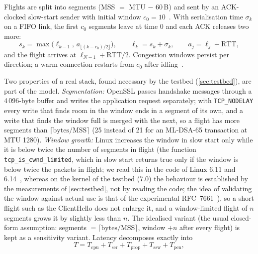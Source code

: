\documentclass[preprint,12pt]{elsarticle}
\begin{document}
Flights are split into segments (MSS $=$ MTU $-$ 60\,B) and sent by an ACK-clocked slow-start sender with initial window $c_0=10$~\cite{rfc6928,rfc5681}. With serialisation time $\sigma_k$ on a FIFO link, the first $c_0$ segments leave at time 0 and each ACK releases two more:
\begin{equation}
s_k=\max\!\big(\ell_{k-1},\,a_{\lfloor (k-c_0)/2\rfloor}\big),\qquad \ell_k=s_k+\sigma_k,\qquad a_j=\ell_j+\mathrm{RTT},
\label{eq:flight}
\end{equation}
and the flight arrives at $\ell_{N-1}+\mathrm{RTT}/2$. Congestion windows persist per direction; a warm connection restarts from $c_0$ after idling~\cite{rfc5681}.

Two properties of a real stack, found necessary by the testbed (\cref{sec:testbed}), are part of the model. \emph{Segmentation:} OpenSSL passes handshake messages through a 4\,096-byte buffer and writes the application request separately; with \texttt{TCP\_NODELAY} every write that finds room in the window ends in a segment of its own, and a write that finds the window full is merged with the next, so a flight has more segments than $\lceil\text{bytes}/\text{MSS}\rceil$ (25 instead of 21 for an ML-DSA-65 transaction at MTU 1280). \emph{Window growth:} Linux increases the window in slow start only while it is below twice the number of segments in flight (the function \texttt{tcp\_is\_cwnd\_limited}, which in slow start returns true only if the window is below twice the packets in flight; we read this in the code of Linux 6.11 and 6.14~\cite{linuxtcp}, whereas on the kernel of the testbed (7.0) the behaviour is established by the measurements of \cref{sec:testbed}, not by reading the code; the idea of validating the window against actual use is that of the experimental RFC~7661~\cite{rfc7661}), so a short flight such as the ClientHello does not enlarge it, and a window-limited flight of $n$ segments grows it by slightly less than $n$. The idealised variant (the usual closed-form assumption: segments $=\lceil\text{bytes}/\text{MSS}\rceil$, window $+n$ after every flight) is kept as a sensitivity variant. Latency decomposes exactly into
\begin{equation}
T=T_\text{cpu}+T_\text{ser}+T_\text{prop}+T_\text{ssw}+T_\text{pen},
\label{eq:latency}
\end{equation}
\end{document}
